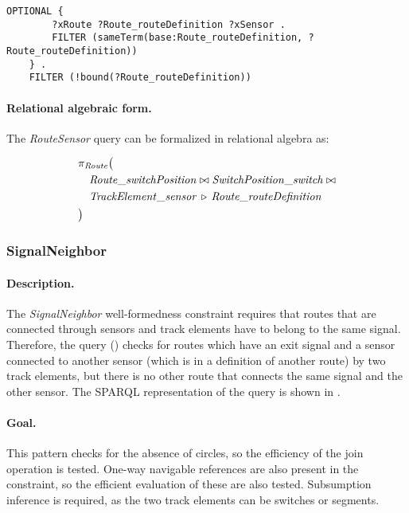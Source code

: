 \begin{lstlisting}[caption=SPARQL 1.0 formula for the NAC part of the RouteSensor query, label=lst:routesensor-sparql-nac]
    OPTIONAL {
        ?xRoute ?Route_routeDefinition ?xSensor .
        FILTER (sameTerm(base:Route_routeDefinition, ?Route_routeDefinition))
    } .
    FILTER (!bound(?Route_routeDefinition))
\end{lstlisting}


\paragraph{Relational algebraic form.}  The \textit{RouteSensor} query can be formalized in relational algebra as:

\begin{align*}
& \pi_{\mathit{Route}} \big( \\
& \quad \mathit{Route\_switchPosition} \bowtie \mathit{SwitchPosition\_switch} \bowtie \\
& \quad \mathit{TrackElement\_sensor} \, \triangleright \, \mathit{Route\_routeDefinition} \\
& \big)
\end{align*}

\subsubsection{SignalNeighbor}

\paragraph{Description.} The \textit{SignalNeighbor} well-formedness constraint requires that routes that are connected through sensors and track elements have to belong to the same signal. Therefore, the query () checks for routes which have an exit signal and a sensor connected to another sensor (which is in a definition of another route) by two track elements, but there is no other route that connects the same signal and the other sensor. The SPARQL representation of the query is shown in .

\paragraph{Goal.} This pattern checks for the absence of circles, so the efficiency of the join operation is tested. One-way navigable references are also present in the constraint, so the efficient evaluation of these are also tested. Subsumption inference is required, as the two track elements can be switches or segments.

